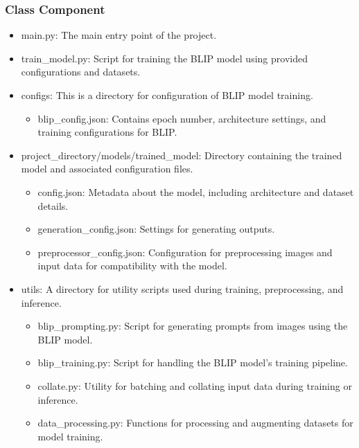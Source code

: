 \documentclass[conference]{IEEEtran}
\begin{document}
\subsubsection{Class Component}
\begin{itemize}
    \item main.py: The main entry point of the project. \\
    \item train\_model.py: Script for training the BLIP model using provided configurations and datasets. \\
    \item configs: This is a directory for configuration of BLIP model training.
    \begin{itemize}
        \item blip\_config.json: Contains epoch number, architecture settings, and training configurations for BLIP. \\
    \end{itemize}
    \item project\_directory/models/trained\_model: Directory containing the trained model and associated configuration files.
    \begin{itemize}
        \item config.json: Metadata about the model, including architecture and dataset details. \\
        \item generation\_config.json: Settings for generating outputs. \\
        \item preprocessor\_config.json: Configuration for preprocessing images and input data for compatibility with the model. \\
    \end{itemize}
    \item utils: A directory for utility scripts used during training, preprocessing, and inference.
    \begin{itemize}
        \item blip\_prompting.py: Script for generating prompts from images using the BLIP model. \\
        \item blip\_training.py: Script for handling the BLIP model's training pipeline. \\
        \item collate.py: Utility for batching and collating input data during training or inference. \\
        \item data\_processing.py: Functions for processing and augmenting datasets for model training. \\
    \end{itemize}
\end{itemize}
\end{document}
